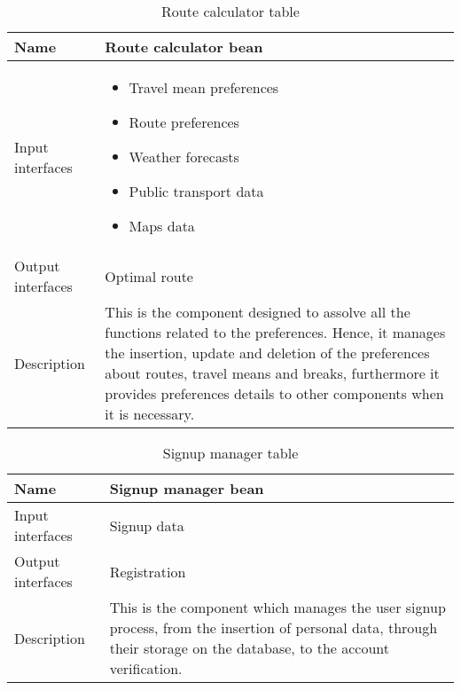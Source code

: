 \begin{flushleft}
	
	\begin{table}[htp]
		
		\begin{tabular}{l|p{7cm}}
		
			Name&\textbf{Route calculator bean}\\
			\hline
			\hline
			Input interfaces& 
			\begin{itemize}
				\item Travel mean preferences \item Route preferences \item Weather forecasts \item Public transport data \item Maps data
			\end{itemize} \\
			\hline
			Output interfaces& Optimal route\\
			\hline
			Description&This is the component designed to assolve all the functions related to the preferences. Hence, it manages the insertion, update and deletion of the preferences about routes, travel means and breaks, furthermore it provides preferences details to other components when it is necessary. \\
			\hline
			
		\end{tabular}
		
		\caption{Route calculator table } 
		\label{tab:routecalculatortable}
		
	\end{table}
	
\end{flushleft}

\begin{flushleft}
	
	\begin{table}[htp]
		
		\begin{tabular}{l|p{7cm}}
		
			Name&\textbf{Signup manager bean}\\
			\hline
			\hline
			Input interfaces& Signup data \\
			\hline
			Output interfaces& Registration\\
			\hline
			Description&This is the component which manages the user signup process, from the insertion of personal data, through their storage on the database, to the account verification. \\
			\hline
			
		\end{tabular}
		
		\caption{Signup manager table } 
		\label{tab:signupmanagertable}
		
	\end{table}
	
\end{flushleft}

